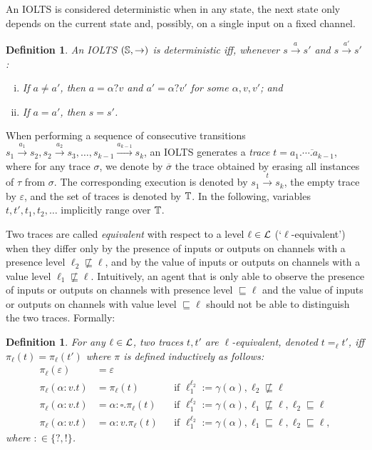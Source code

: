 \documentclass[preprint,5p,twocolumn]{elsarticle}
\newtheorem{definition}[theorem]{Definition}
\begin{document}
An IOLTS is considered deterministic when in any state, the next state only depends on the
current state and, possibly, on a single input on a fixed channel.

\begin{definition}
  An IOLTS $(\mathbb{S}, \rightarrow)$ is deterministic iff, whenever $s \xrightarrow{a} s'$ and $s \xrightarrow{a'} s'$:
  \begin{enumerate}[(i)]
  \item If $a \neq a'$, then $a = \alpha ? v$ and $a' = \alpha ? v'$ for some $\alpha,v,v'$; and
  \item If $a = a'$, then $s = s'$.
  \end{enumerate}
\end{definition}

When performing a sequence of consecutive transitions
$s_1 \xrightarrow{a_1} s_2, s_2 \xrightarrow{a_2} s_3, \dots, s_{k-1} \xrightarrow{a_{k-1}} s_k$,
an IOLTS generates a \emph{trace} $t = \overline{a_1 . \cdots . a_{k-1}}$, where for any trace
$\sigma$, we denote by $\overline{\sigma}$ the trace obtained by erasing all instances of
$\tau$ from $\sigma$. The corresponding execution is
denoted by $s_1 \xrightarrow{t} s_k$, the empty trace by $\varepsilon$, and the set of traces
is denoted by $\mathbb{T}$.
In the following, variables $t, t', t_1, t_2, \dots$ implicitly range over $\mathbb{T}$.

Two traces are called \emph{equivalent} with respect to a level $\ell \in \mathcal{L}$
(`$\ell$-equivalent') when they differ only by the presence of inputs or outputs on channels with
a presence level $\ell_2 \not\sqsubseteq \ell$, and by the value of inputs or outputs on channels
with a value level $\ell_1 \not\sqsubseteq \ell$. Intuitively, an agent that is only able to
observe the presence of inputs or outputs on channels with presence level $\sqsubseteq \ell$ and the value of
inputs or outputs on channels with value level $\sqsubseteq \ell$ should not be able to distinguish the two
traces. Formally:
\begin{definition}
  For any $\ell \in \mathcal{L}$, two traces $t,t'$ are $\ell$-equivalent, denoted $t =_\ell t'$, iff
  $\pi_\ell(t) = \pi_\ell(t')$ where $\pi$ is defined inductively as follows:
  \begin{align*}
    \pi_\ell(\varepsilon) &=  \varepsilon \\
    \pi_\ell(\alpha : v.t) &= \pi_\ell(t) & & \text{if } \ell_1^{\ell_2}:=\gamma(\alpha), \ell_2 \not\sqsubseteq \ell\\
    \pi_\ell(\alpha : v.t) &= \alpha : \square. \pi_\ell(t) & & \text{if } \ell_1^{\ell_2}:=\gamma(\alpha), \ell_1 \not\sqsubseteq \ell, \ell_2 \sqsubseteq \ell\\
    \pi_\ell(\alpha : v.t) &= \alpha : v . \pi_\ell(t) & & \text{if } \ell_1^{\ell_2}:=\gamma(\alpha), \ell_1\sqsubseteq \ell,\ell_2 \sqsubseteq \ell,
  \end{align*}
  where $: \in \{?,!\}$.
\end{definition}
\end{document}
